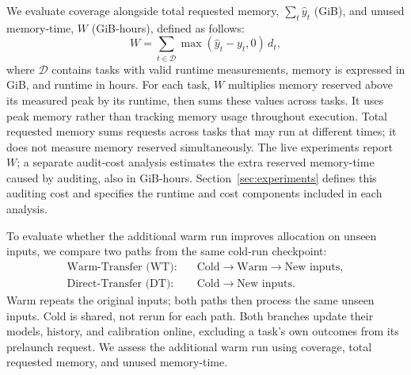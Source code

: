 We evaluate coverage alongside total requested memory, $\sum_t\hat y_t$
(GiB), and unused memory-time, $W$ (GiB-hours), defined as follows:
\begin{equation}
W=\sum_{t\in\mathcal{D}}\max(\hat y_t-y_t,0)\,d_t,
\label{eq:unused_memory_time}
\end{equation}
where $\mathcal{D}$ contains tasks with valid runtime measurements, memory
is expressed in GiB, and runtime in hours. For each task, $W$ multiplies
memory reserved above its measured peak by its runtime, then sums these
values across tasks. It uses peak memory rather than tracking memory
usage throughout execution. Total requested memory sums requests across
tasks that may run at different times; it does not measure memory reserved
simultaneously. The live experiments report $W$; a separate audit-cost
analysis estimates the extra reserved memory-time caused by auditing,
also in GiB-hours. Section~\ref{sec:experiments} defines this auditing cost
and specifies the runtime and cost components included in each analysis.

To evaluate whether the additional warm run improves allocation on unseen
inputs, we compare two paths from the same cold-run checkpoint:
\[
\begin{aligned}
\text{Warm-Transfer (WT):}\quad &\text{Cold} \rightarrow \text{Warm} \rightarrow \text{New inputs},\\
\text{Direct-Transfer (DT):}\quad &\text{Cold} \rightarrow \text{New inputs}.
\end{aligned}
\]
Warm repeats the original inputs; both paths then process the same unseen
inputs. Cold is shared, not rerun for each path. Both branches update their
models, history, and calibration online, excluding a task's own outcomes
from its prelaunch request. We assess the additional warm run using
coverage, total requested memory, and unused memory-time.
